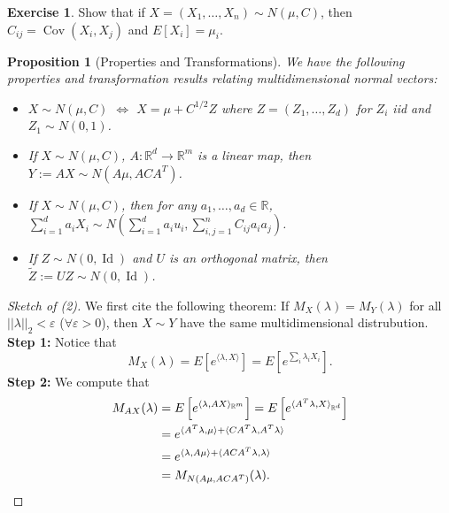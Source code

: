 \documentclass[12pt,reqno]{article}
\theoremstyle{plain}
\newtheorem{prop}[theorem]{Proposition}
\theoremstyle{definition}
\newtheorem{exercise}[theorem]{Exercise}
\begin{document}
\begin{exercise}
Show that if $X = (X_1, \ldots, X_n) \sim N(\mu, C)$, then 
$C_{ij} = \operatorname{Cov}(X_i, X_j)$ and $E[X_i] = \mu_i$. 
\end{exercise} 

\begin{prop}[Properties and Transformations]
We have the following properties and transformation results relating 
multidimensional normal vectors:
\begin{itemize} 

\item[(1)] $X \sim N(\mu,C)$ $\iff$ $X = \mu+C^{1/2} Z$ where 
     $Z = (Z_1,\ldots,Z_d)$ for $Z_i$ iid and $Z_1 \sim N(0, 1)$. 
\item[(2)] If $X \sim N(\mu,C)$, $A: \mathbb{R}^d \rightarrow \mathbb{R}^m$ 
     is a linear map, then $Y := AX \sim N(A\mu, ACA^T)$. 
\item[(3)] If $X \sim N(\mu,C)$, then for any 
     $a_1,\ldots,a_d \in \mathbb{R}$, 
     $\sum_{i=1}^d a_iX_i \sim N\left(\sum_{i=1}^d a_iu_i, 
     \sum_{i,j=1}^n C_{ij}a_ia_j\right)$. 
\item[(4)] If $Z \sim N(0, \operatorname{Id})$ and $U$ is an 
     orthogonal matrix, then 
     $\widetilde{Z} := UZ \sim N(0, \operatorname{Id})$. 

\end{itemize} 
\end{prop} 
\begin{proof}[Sketch of (2)]
We first cite the following theorem: If $M_X(\lambda) = M_Y(\lambda)$ 
for all $||\lambda||_2 < \varepsilon$ ($\forall \varepsilon > 0$), then 
$X \sim Y$ have the same multidimensional distrubution. \\ 
\textbf{Step 1:} Notice that 
\[
M_X(\lambda) = E[e^{\langle \lambda, X \rangle}] = 
     E\left[e^{\sum_i \lambda_i X_i}\right]. 
\]
\textbf{Step 2:} We compute that 
\begin{align*} 
M_{AX}(\lambda) & = E\left[e^{\langle \lambda, AX \rangle_{\mathbb{R}^m}}  
     \right] = E\left[e^{\langle A^T\lambda, X \rangle_{\mathbb{R}^d}}  
     \right] \\ 
     & = e^{\langle A^T\lambda, \mu \rangle + \langle CA^T\lambda, 
     A^T\lambda \rangle} \\ 
     & = e^{\langle \lambda, A\mu \rangle + \langle ACA^T\lambda, 
     \lambda \rangle} \\ 
     & = M_{N(A\mu,ACA^T)}(\lambda). 
     \qedhere 
\end{align*} 
\end{proof} 
\end{document}
